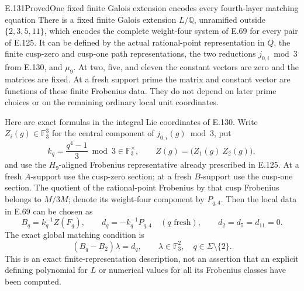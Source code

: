 \begin{result}{E.131}{Proved}{One fixed finite Galois extension encodes every fourth-layer matching equation}
There is a fixed finite Galois extension
\(L/\mathbb Q\), unramified outside
\(\{2,3,5,11\}\), which encodes the complete
weight-four system of E.69 for every pair of E.125.
It can be defined by the actual rational-point
representation in \(Q\), the finite cusp-zero and
cusp-one path representations, the two reductions
\(j_{0,i}\bmod3\) from E.130, and \(\mu_9\).
At two, five, and eleven the constant vectors are zero
and the matrices are fixed. At a fresh support prime
the matrix and constant vector are functions of these
finite Frobenius data. They do not depend on later
prime choices or on the remaining ordinary local
unit coordinates.

Here are exact formulas in the integral Lie coordinates
of E.130. Write \(Z_i(g)\in\mathbb F_3^3\) for the
central component of \(j_{0,i}(g)\bmod3\), put
\[
 k_q=\frac{q^4-1}{3}\bmod3\in\mathbb F_3^\times ,
 \qquad Z(g)=\bigl(Z_1(g)\ Z_2(g)\bigr),
 \tag{E.131.1}
\]
and use the \(H_9\)-aligned Frobenius representative
already prescribed in E.125.
At a fresh \(A\)-support use the cusp-zero section;
at a fresh \(B\)-support use the cusp-one section.
The quotient of the rational-point Frobenius by that
cusp Frobenius belongs to \(M/3M\); denote its
weight-four component by \(P_{q,4}\).
Then the local data in E.69 can be chosen as
\[
 B_q=k_q^{-1}Z(F_q),\qquad
 d_q=-k_q^{-1}P_{q,4}
                     \quad(q\text{ fresh}),\qquad
 d_2=d_5=d_{11}=0 .
 \tag{E.131.2}
\]
The exact global matching condition is
\[
 (B_q-B_2)\lambda=d_q,\qquad
       \lambda\in\mathbb F_3^2,\quad
       q\in\Sigma\setminus\{2\}.
 \tag{E.131.3}
\]
This is an exact finite-representation description,
not an assertion that an explicit defining polynomial
for \(L\) or numerical values for all its Frobenius
classes have been computed.
\end{result}
